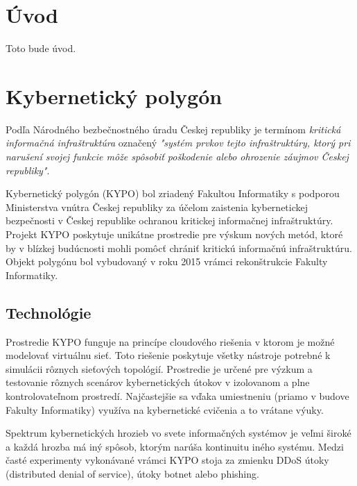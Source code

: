 \documentclass[
  digital, %
  twoside, %
  notable,   %
  nolof,   %
  nolot,   %
]{fithesis3}
\begin{document}
\chapter*{Úvod}
Toto bude úvod.

\chapter{Kybernetický polygón}
Podľa Národného bezbečnostného úradu Českej republiky je termínom \textit{kritická informačná infraštruktúra} označený \textit{"systém prvkov tejto infraštruktúry, ktorý pri narušení svojej funkcie môže spôsobiť poškodenie alebo ohrozenie záujmov Českej republiky"}\cite{nbu2012}.

Kybernetický polygón (KYPO) bol zriadený Fakultou Informatiky s podporou Ministerstva vnútra Českej republiky za účelom zaistenia kybernetickej bezpečnosti v Českej republike ochranou kritickej informačnej infraštruktúry. Projekt KYPO poskytuje unikátne prostredie pre výskum nových metód, ktoré by v blízkej budúcnosti mohli pomôcť chrániť kritickú informačnú infraštruktúru\cite{dankovvcikova2015konfigurace}. Objekt polygónu bol vybudovaný v roku 2015 vrámci rekonštrukcie Fakulty Informatiky.

\section{Technológie}
Prostredie KYPO funguje na princípe cloudového riešenia v ktorom je možné modelovať virtuálnu sieť\cite{eichler2014analytical}. Toto riešenie poskytuje všetky nástroje potrebné k simulácii rôznych sieťových topológií. Prostredie je určené pre výzkum a testovanie rôznych scenárov kybernetických útokov v izolovanom a plne kontrolovateľnom prostredí\cite{vceleda2015kypo}. Najčastejšie sa vďaka umiestneniu (priamo v budove Fakulty Informatiky) využíva na kybernetické cvičenia a to vrátane výuky.

Spektrum kybernetických hrozieb vo svete informačných systémov je veľmi široké a každá hrozba má iný spôsob, ktorým narúša kontinuitu iného systému. Medzi časté experimenty vykonávané vrámci KYPO stoja za zmienku DDoS útoky (distributed denial of service), útoky botnet alebo phishing\cite{vcegan2014navrh, celeda2013projekt}.
\end{document}

